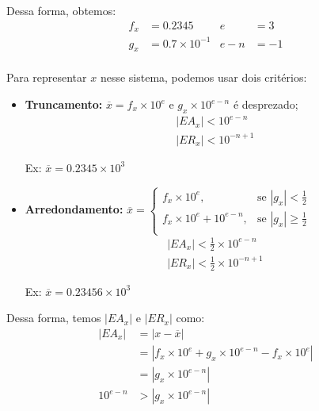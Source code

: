 \documentclass{article}
\begin{document}
            Dessa forma, obtemos:
            \begin{align*}
                f_x &= 0.2345               &               e &= 3\\
                g_x &= 0.7 \times 10^{-1}   &               e-n &= -1\\
            \end{align*}


            Para representar $x$ nesse sistema, podemos usar dois critérios:
            \begin{itemize}
                \item \textbf{Truncamento:} $\overline{x} = f_x \times 10^e$ e $g_x \times 10^{e-n}$ é desprezado;
                    \begin{gather*}
                        |EA_x| < 10^{e-n}\\
                        |ER_x| < 10^{-n+1}
                    \end{gather*}

                    Ex: $\overline{x} = 0.2345 \times 10^3$

                \item \textbf{Arredondamento:} $\overline{x} = \begin{cases}
                        f_x  \times 10^e, & \text{se $|g_x| < \frac{1}{2}$}\\
                        f_x  \times 10^e  + 10^{e - n}, & \text{se $|g_x| \geq \frac{1}{2}$}\\
                    \end{cases}$
                    \begin{gather*}
                        |EA_x| < \frac{1}{2} \times 10^{e-n}\\
                        |ER_x| < \frac{1}{2} \times 10^{-n+1}
                    \end{gather*}

                    Ex: $\overline{x} = 0.23456 \times 10^3$
            \end{itemize}
            
            Dessa forma, temos $|EA_x|$ e $|ER_x|$ como:
            \begin{align*}
                |EA_x| &= |x - \overline{x}| \\
                &= |f_x \times 10^e + g_x \times 10^{e-n} - f_x \times 10^e|\\
                &= |g_x \times 10^{e-n}|\\
                10^{e-n} &> |g_x \times 10^{e-n}|\\
            \end{align*}
\end{document}
